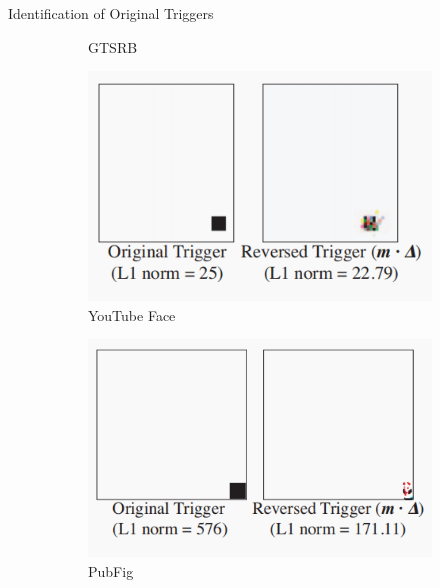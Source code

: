 \documentclass{beamer}
\begin{document}
\begin{frame}{Identification of Original Triggers}
\begin{figure}[h!]
\begin{subfigure}{0.3\textwidth}
                \caption{GTSRB}
                \label{fig:revtrigger2}
            \end{subfigure}
            \hfill
            \begin{subfigure}{0.3\textwidth}
                \includegraphics[width=\textwidth]{utubeface.png} %
                \caption{YouTube Face}
                \label{fig:revtrigger3}
            \end{subfigure}
            \hfill
            \begin{subfigure}{0.3\textwidth}
                \includegraphics[width=\textwidth]{PubFig.png} %
                \caption{PubFig}
                \label{fig:revtrigger4}
            \end{subfigure}
            \hfill
            \begin{subfigure}{0.3\textwidth}

\end{subfigure}
\end{figure}
\end{frame}
\end{document}
